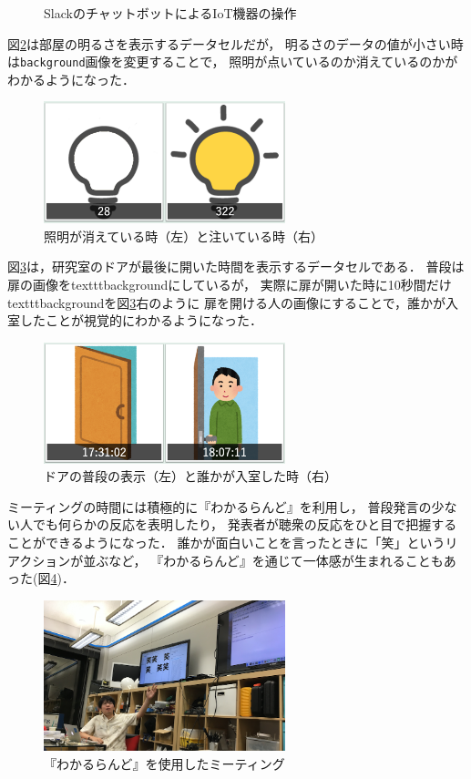 \begin{figure}[h]
\centering
{}
\caption{SlackのチャットボットによるIoT機器の操作}
\label{slack}
\end{figure}

図\ref{light}は部屋の明るさを表示するデータセルだが，
明るさのデータの値が小さい時は\texttt{background}画像を変更することで，
照明が点いているのか消えているのかがわかるようになった．

\begin{figure}[h]
\centering
\includegraphics[width=7cm]{images/light.png}
\caption{照明が消えている時（左）と注いている時（右）}
\label{light}
\end{figure}

図\ref{door}は，研究室のドアが最後に開いた時間を表示するデータセルである．
普段は扉の画像をtexttt{background}にしているが，
実際に扉が開いた時に10秒間だけtexttt{background}を図\ref{door}右のように
扉を開ける人の画像にすることで，誰かが入室したことが視覚的にわかるようになった．

\begin{figure}[h]
\centering
\includegraphics[width=7cm]{images/door.png}
\caption{ドアの普段の表示（左）と誰かが入室した時（右）}
\label{door}
\end{figure}

ミーティングの時間には積極的に『わかるらんど』を利用し，
普段発言の少ない人でも何らかの反応を表明したり，
発表者が聴衆の反応をひと目で把握することができるようになった．
誰かが面白いことを言ったときに「笑」というリアクションが並ぶなど，
『わかるらんど』を通じて一体感が生まれることもあった(図\ref{wara})．

\begin{figure}[h]
\centering
\includegraphics[width=7cm]{images/wara.png}
\caption{『わかるらんど』を使用したミーティング}
\label{wara}
\end{figure}